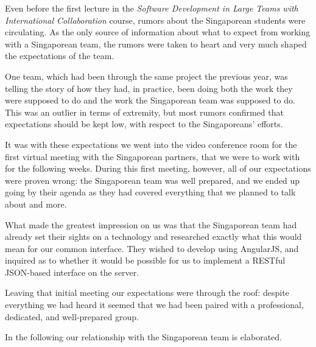 Even before the first lecture in the \emph{Software
Development in Large Teams with International Collaboration} course, rumors
about the Singaporean students were circulating. As the only source of
information about what to expect from working with a Singaporean team, the
rumors were taken to heart and very much shaped the expectations of the team.

One team, which had been through the same project the previous year, was telling
the story of how they had, in
practice, been doing both the work they were supposed to do and the work the
Singaporean team was supposed to do. This was an outlier in terms of extremity,
but most rumors confirmed that expectations should be kept low, with respect to
the Singaporeans' efforts.

It was with these expectations we went into the video conference room for the
first virtual meeting with the Singaporean partners, that we were to work with
for the following weeks. During this first meeting, however, all of our
expectations were proven wrong: the Singaporean team was well prepared, and we
ended up going by their agenda as they had covered everything that we planned to talk
about and more.

What made the greatest impression on us was that the Singaporean team had
already set their sights on a technology and researched exactly what this would
mean for our common interface. They wished to develop using AngularJS, and
inquired as to whether it would be possible for us to implement a RESTful
JSON-based interface on the server.

Leaving that initial meeting our expectations were through the roof: despite
everything we had heard it seemed that we had been paired with a professional,
dedicated, and well-prepared group.

In the following our relationship with the Singaporean team is elaborated.
